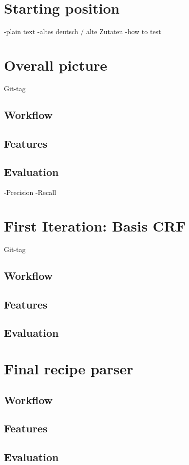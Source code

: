 \documentclass[12pt, twoside]{report}
\begin{document}
\section{Starting position}
-plain text
-altes deutsch / alte Zutaten
-how to test

\section{Overall picture}
Git-tag
\subsection{Workflow}
\subsection{Features}
\subsection{Evaluation}
-Precision -Recall

\section{First Iteration: Basis CRF}
Git-tag
\subsection{Workflow}
\subsection{Features}
\subsection{Evaluation}

\section{Final recipe parser}
\subsection{Workflow}
\subsection{Features}
\subsection{Evaluation}
\end{document}
